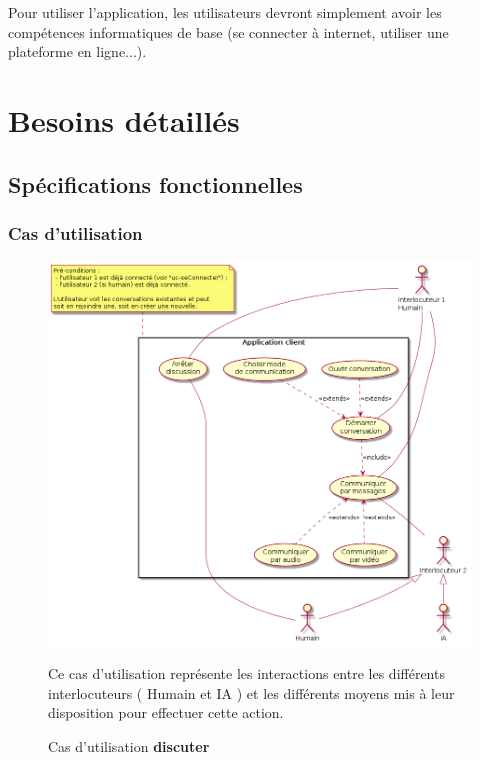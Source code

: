 \documentclass[11pt,dvipsnames,svgnames]{report}
\begin{document}
Pour utiliser l'application, les utilisateurs devront simplement avoir les compétences informatiques de base (se connecter à internet, utiliser une plateforme en ligne...).

\chapter{Besoins détaillés}
\section{Spécifications fonctionnelles}
\subsection{Cas d'utilisation}
\begin{figure}[H]
\includegraphics[scale=0.55]{images/uc-discuter.png}
\caption{Cas d'utilisation \textbf{discuter}}
	Ce cas d'utilisation représente les interactions entre les différents interlocuteurs ( Humain et IA ) et les différents moyens mis à leur disposition pour effectuer cette action.
\end{figure}
\end{document}
